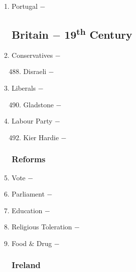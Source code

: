 \documentclass[12pt]{article}
\begin{document}
\begin{enumerate}
\item Portugal $-$ 

\subsection{Britain $-$ 19\textsuperscript{th} Century}

\item Conservatives $-$ 

\begin{enumerate}[label=\arabic{*}.]
\setcounter{enumii}{487}

\item Disraeli $-$

\end{enumerate}
\setcounter{enumi}{488}

\item Liberals $-$ 

\begin{enumerate}[label=\arabic{*}.]
\setcounter{enumii}{489}

\item Gladstone $-$

\end{enumerate}
\setcounter{enumi}{490}

\item Labour Party $-$

\begin{enumerate}[label=\arabic{*}.]
\setcounter{enumii}{491}

\item Kier Hardie $-$ 

\end{enumerate}
\setcounter{enumi}{492}

\subsubsection{Reforms}

\item Vote $-$ 

\item Parliament $-$ 

\item Education $-$ 

\item Religious Toleration $-$ 

\item Food \& Drug $-$ 

\subsubsection{Ireland}


\end{enumerate}
\end{document}
